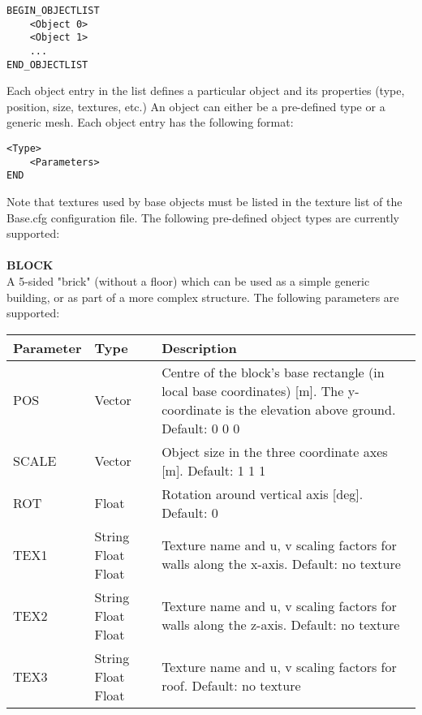 \documentclass[Orbiter Developer Manual.tex]{subfiles}
\begin{document}
\begin{lstlisting}[language=OSFS]
BEGIN_OBJECTLIST
	<Object 0>
	<Object 1>
	...
END_OBJECTLIST
\end{lstlisting}

\noindent
Each object entry in the list defines a particular object and its properties (type, position, size, textures, etc.) An object can either be a pre-defined type or a generic mesh. Each object entry has the following format:

\begin{lstlisting}[language=OSFS]
<Type>
	<Parameters>
END
\end{lstlisting}

\noindent
Note that textures used by base objects must be listed in the texture list of the Base.cfg configuration file.
The following pre-defined object types are currently supported:\\
\\
\textbf{BLOCK}\\
A 5-sided "brick" (without a floor) which can be used as a simple generic building, or as part of a more complex structure. The following parameters are supported:

	\begin{longtable}{ |p{}|p{}|p{}| }
	\hline\rule{0pt}{2ex}
	\textbf{Parameter} & \textbf{Type} & \textbf{Description}\\
	\hline\rule{0pt}{2ex}
	POS & Vector & Centre of the block's base rectangle (in local base coordinates) [m]. The y-coordinate is the elevation above ground. Default: 0 0 0\\
	\hline\rule{0pt}{2ex}
	SCALE & Vector & Object size in the three coordinate axes [m]. Default: 1 1 1\\
	\hline\rule{0pt}{2ex}
	ROT & Float & Rotation around vertical axis [deg]. Default: 0\\
	\hline\rule{0pt}{2ex}
	TEX1 & String Float Float & Texture name and u, v scaling factors for walls along the x-axis. Default: no texture\\
	\hline\rule{0pt}{2ex}
	TEX2 & String Float Float & Texture name and u, v scaling factors for walls along the z-axis. Default: no texture\\
	\hline\rule{0pt}{2ex}
	TEX3 & String Float Float & Texture name and u, v scaling factors for roof. Default: no texture\\
	\hline
	\end{longtable}
\end{document}
